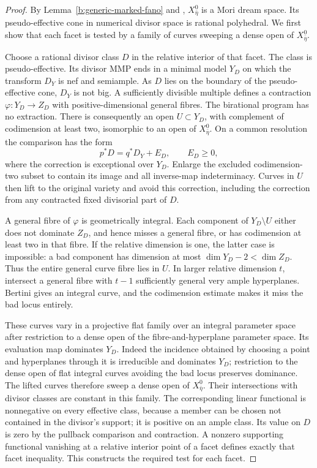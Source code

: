 \begin{proof}
By Lemma~\ref{b:generic-marked-fano} and
\cite[Corollary~1.3.1]{BCHM}, \(X^0_{\bar\eta}\) is a Mori dream space.
Its pseudo-effective cone in numerical divisor space is rational
polyhedral. We first show that each facet is tested by a family of curves
sweeping a dense open of \(X^0_{\bar\eta}\).

Choose a rational divisor class \(D\) in the relative interior of that
facet. The class is pseudo-effective. Its divisor MMP ends in a minimal
model \(Y_D\) on which the transform \(D_Y\) is nef and semiample.
As \(D\) lies on the boundary of the pseudo-effective cone, \(D_Y\) is
not big. A sufficiently divisible multiple defines a contraction
\(\varphi:Y_D\to Z_D\) with positive-dimensional general fibres.
The birational program has no extraction. There is consequently an open
\(U\subset Y_D\), with complement of codimension at least two, isomorphic
to an open of \(X^0_{\bar\eta}\). On a common resolution the comparison
has the form
\[
 p^*D=q^*D_Y+E_D,\qquad E_D\geq0,
\]
where the correction is exceptional over \(Y_D\). Enlarge the excluded
codimension-two subset to contain its image and all inverse-map
indeterminacy. Curves in \(U\) then lift to the original variety and
avoid this correction, including the correction from any contracted
fixed divisorial part of \(D\).

A general fibre of \(\varphi\) is geometrically integral. Each component
of \(Y_D\setminus U\) either does not dominate \(Z_D\), and hence misses
a general fibre, or has codimension at least two in that fibre. If the
relative dimension is one, the latter case is impossible: a bad component
has dimension at most \(\dim Y_D-2<\dim Z_D\). Thus the entire general
curve fibre lies in \(U\). In larger relative dimension \(t\), intersect
a general fibre with \(t-1\) sufficiently general very ample hyperplanes.
Bertini gives an integral curve, and the codimension estimate makes it
miss the bad locus entirely.

These curves vary in a projective flat family over an integral parameter
space after restriction to a dense open of the fibre-and-hyperplane
parameter space. Its evaluation map dominates \(Y_D\). Indeed the
incidence obtained by choosing a point and hyperplanes through it is
irreducible and dominates \(Y_D\); restriction to the dense open of flat
integral curves avoiding the bad locus preserves dominance. The lifted
curves therefore sweep a dense open of \(X^0_{\bar\eta}\). Their
intersections with divisor classes are constant in this family. The
corresponding linear functional is nonnegative on every effective class,
because a member can be chosen not contained in the divisor's support;
it is positive on an ample class. Its value on \(D\) is zero by the
pullback comparison and contraction. A nonzero supporting functional
vanishing at a relative interior point of a facet defines exactly that
facet inequality. This constructs the required test for each facet.


\end{proof}
